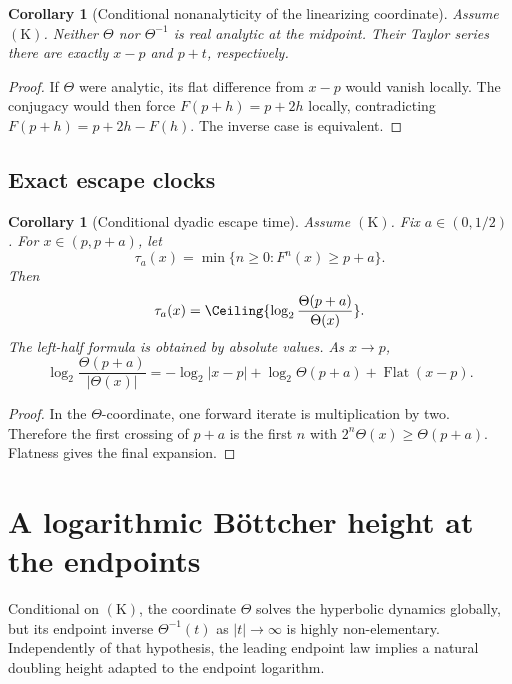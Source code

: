 \documentclass[11pt,oneside]{article}
\newtheorem{corollary}[theorem]{Corollary}
\theoremstyle{definition}
\theoremstyle{remark}
\newcommand{\flatremainder}{\operatorname{Flat}}
\begin{document}
\begin{corollary}[Conditional nonanalyticity of the linearizing coordinate]
\label{cor:theta-nonanalytic}
Assume \(\mathrm{(K)}\).  Neither \(\Theta\) nor \(\Theta^{-1}\) is real analytic at the
midpoint.  Their Taylor series there are exactly \(x-p\) and \(p+t\), respectively.
\end{corollary}

\begin{proof}
If \(\Theta\) were analytic, its flat difference from \(x-p\) would vanish locally.  The
conjugacy would then force \(F(p+h)=p+2h\) locally, contradicting
\(F(p+h)=p+2h-F(h)\).  The inverse case is equivalent.
\end{proof}

\subsection{Exact escape clocks}

\begin{corollary}[Conditional dyadic escape time]
\label{cor:escape-clock}
Assume \(\mathrm{(K)}\).  Fix \(a\in(0,1/2)\).  For \(x\in(p,p+a)\), let
\[
 \tau_a(x)=\min\{n\ge0:F^n(x)\ge p+a\}.
\]
Then
\begin{equation}
 \tau_a(x)=
 \Ceiling{\log_2\frac{\Theta(p+a)}{\Theta(x)}}.
 \label{eq:escape-time}
\end{equation}
The left-half formula is obtained by absolute values.  As \(x\to p\),
\begin{equation}
 \log_2\frac{\Theta(p+a)}{|\Theta(x)|}
 =-\log_2|x-p|+\log_2\Theta(p+a)+\flatremainder(x-p).
 \label{eq:escape-asymptotic}
\end{equation}
\end{corollary}

\begin{proof}
In the \(\Theta\)-coordinate, one forward iterate is multiplication by two.  Therefore the
first crossing of \(p+a\) is the first \(n\) with
\(2^n\Theta(x)\ge\Theta(p+a)\).  Flatness gives the final expansion.
\end{proof}

\section{A logarithmic B\"ottcher height at the endpoints}
\label{sec:bottcher}

Conditional on \(\mathrm{(K)}\), the coordinate \(\Theta\) solves the hyperbolic dynamics
globally, but its endpoint inverse \(\Theta^{-1}(t)\) as \(|t|\to\infty\) is highly
non-elementary.  Independently of that hypothesis, the leading endpoint law implies a natural
doubling height adapted to the endpoint logarithm.
\end{document}
